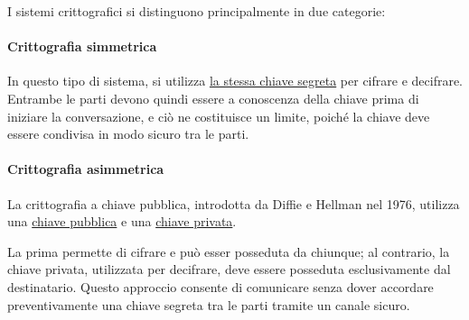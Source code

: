 \vspace{1em}\noindent


\noindent I sistemi crittografici si distinguono principalmente
in due categorie:

\paragraph{Crittografia simmetrica}
In questo tipo di sistema, si utilizza \underline{la stessa chiave segreta} per cifrare e decifrare. Entrambe le parti devono quindi essere a conoscenza della chiave prima di iniziare la conversazione, e ciò ne costituisce un limite, poiché la chiave deve essere condivisa in modo sicuro tra le parti.

\paragraph{Crittografia asimmetrica}
La crittografia a chiave pubblica, introdotta da Diffie e Hellman
nel 1976, utilizza una \underline{chiave pubblica} e una \underline{chiave privata}.

\noindent La prima permette di cifrare e può esser posseduta da chiunque; al contrario, la chiave privata, utilizzata per decifrare, deve essere posseduta esclusivamente dal destinatario. Questo approccio consente di comunicare senza dover accordare
preventivamente una chiave segreta tra le parti tramite un canale sicuro.
\vspace{1em}


